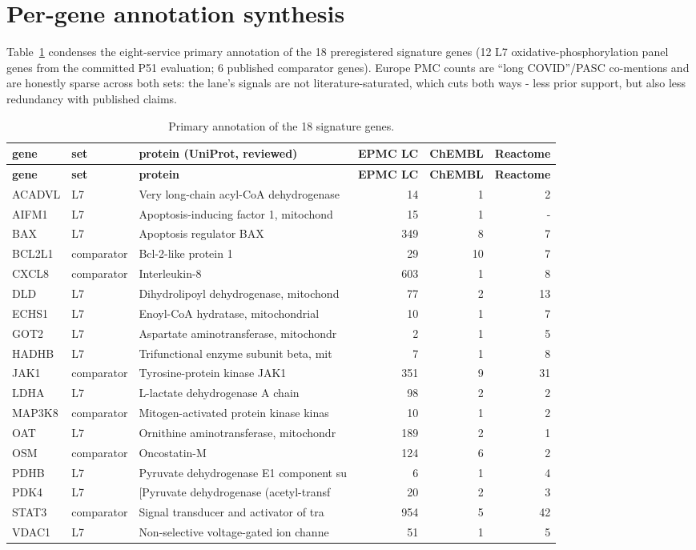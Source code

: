 \documentclass[11pt,a4paper]{article}
\begin{document}
\section{Per-gene annotation synthesis}
Table~\ref{tab:genes} condenses the eight-service primary annotation of the 18
preregistered signature genes (12 L7 oxidative-phosphorylation panel genes
from the committed P51 evaluation; 6 published comparator genes). Europe PMC
counts are ``long COVID''/PASC co-mentions and are honestly sparse across
both sets: the lane's signals are not literature-saturated, which cuts both
ways - less prior support, but also less redundancy with published claims.

\begin{longtable}{lllrrr}
\caption{Primary annotation of the 18 signature genes.}\label{tab:genes}\\
\textbf{gene} & \textbf{set} & \textbf{protein (UniProt, reviewed)} & \textbf{EPMC LC} & \textbf{ChEMBL} & \textbf{Reactome}\\
\endfirsthead
\textbf{gene} & \textbf{set} & \textbf{protein} & \textbf{EPMC LC} & \textbf{ChEMBL} & \textbf{Reactome}\\
\endhead
ACADVL & L7 & Very long-chain acyl-CoA dehydrogenase & 14 & 1 & 2 \\
AIFM1 & L7 & Apoptosis-inducing factor 1, mitochond & 15 & 1 & - \\
BAX & L7 & Apoptosis regulator BAX & 349 & 8 & 7 \\
BCL2L1 & comparator & Bcl-2-like protein 1 & 29 & 10 & 7 \\
CXCL8 & comparator & Interleukin-8 & 603 & 1 & 8 \\
DLD & L7 & Dihydrolipoyl dehydrogenase, mitochond & 77 & 2 & 13 \\
ECHS1 & L7 & Enoyl-CoA hydratase, mitochondrial & 10 & 1 & 7 \\
GOT2 & L7 & Aspartate aminotransferase, mitochondr & 2 & 1 & 5 \\
HADHB & L7 & Trifunctional enzyme subunit beta, mit & 7 & 1 & 8 \\
JAK1 & comparator & Tyrosine-protein kinase JAK1 & 351 & 9 & 31 \\
LDHA & L7 & L-lactate dehydrogenase A chain & 98 & 2 & 2 \\
MAP3K8 & comparator & Mitogen-activated protein kinase kinas & 10 & 1 & 2 \\
OAT & L7 & Ornithine aminotransferase, mitochondr & 189 & 2 & 1 \\
OSM & comparator & Oncostatin-M & 124 & 6 & 2 \\
PDHB & L7 & Pyruvate dehydrogenase E1 component su & 6 & 1 & 4 \\
PDK4 & L7 & [Pyruvate dehydrogenase (acetyl-transf & 20 & 2 & 3 \\
STAT3 & comparator & Signal transducer and activator of tra & 954 & 5 & 42 \\
VDAC1 & L7 & Non-selective voltage-gated ion channe & 51 & 1 & 5 \\
\end{longtable}
\end{document}
